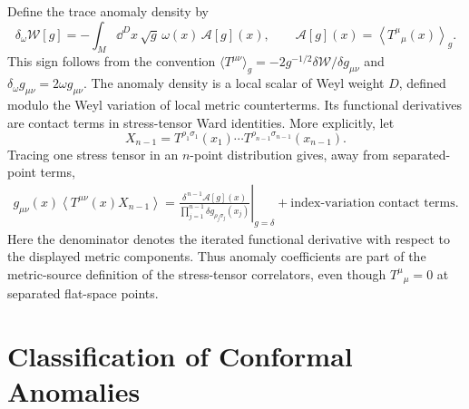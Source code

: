 \begin{definition}
\label{def:weyl-anomaly-density}
Define the trace anomaly density by
\begin{equation}
  \delta_\omega\mathcal W[g]
  =
  -\int_M\dd^D x\,\sqrt g\,\omega(x)\,\mathcal A[g](x),
  \qquad
  \mathcal A[g](x)=\left\langle T^\mu{}_\mu(x)\right\rangle_g .
  \label{eq:weyl-anomaly-density-definition}
\end{equation}
This sign follows from the convention
\(\langle T^{\mu\nu}\rangle_g=-2g^{-1/2}\delta\mathcal W/\delta g_{\mu\nu}\)
and \(\delta_\omega g_{\mu\nu}=2\omega g_{\mu\nu}\).  The anomaly density is a
local scalar of Weyl weight \(D\), defined modulo the Weyl variation of local
metric counterterms.  Its functional derivatives are contact terms in
stress-tensor Ward identities.  More explicitly, let
\[
  X_{n-1}
  =
  T^{\rho_1\sigma_1}(x_1)\cdots
  T^{\rho_{n-1}\sigma_{n-1}}(x_{n-1}).
\]
Tracing one stress tensor in an \(n\)-point distribution gives, away from
separated-point terms,
\[
  \begin{aligned}
  g_{\mu\nu}(x)
  \left\langle T^{\mu\nu}(x)X_{n-1}\right\rangle
  =
  \left.
  \frac{\delta^{\,n-1}\mathcal A[g](x)}
       {\prod_{j=1}^{n-1}\delta g_{\rho_j\sigma_j}(x_j)}
  \right|_{g=\delta}
  +\text{index-variation contact terms}.
  \end{aligned}
\]
Here the denominator denotes the iterated functional derivative with respect
to the displayed metric components.  Thus anomaly coefficients are part of
the metric-source definition of the stress-tensor correlators, even though
\(T^\mu{}_\mu=0\) at separated flat-space points.
\end{definition}

\section{Classification of Conformal Anomalies}

